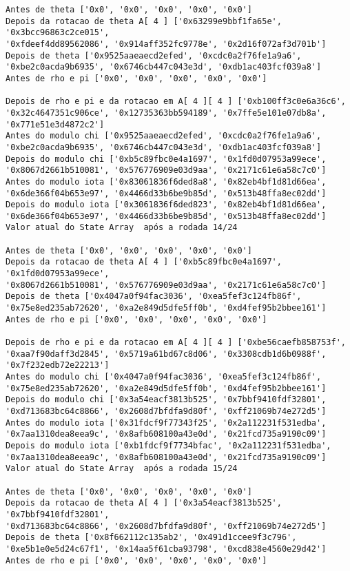 \documentclass[12pt, a4paper]{article}
\begin{document}
\begin{enumerate}
\begin{enumerate}
\begin{verbatim}
Antes de theta ['0x0', '0x0', '0x0', '0x0', '0x0']
Depois da rotacao de theta A[ 4 ] ['0x63299e9bbf1fa65e', '0x3bcc96863c2ce015',
'0xfdeef4dd89562086', '0x914aff352fc9778e', '0x2d16f072af3d701b']
Depois de theta ['0x9525aaeaecd2efed', '0xcdc0a2f76fe1a9a6',
'0xbe2c0acda9b6935', '0x6746cb447c043e3d', '0xdb1ac403fcf039a8']
Antes de rho e pi ['0x0', '0x0', '0x0', '0x0', '0x0']

Depois de rho e pi e da rotacao em A[ 4 ][ 4 ] ['0xb100ff3c0e6a36c6',
'0x32c4647351c906ce', '0x12735363bb594189', '0x7ffe5e101e07db8a',
'0x771e51e3d4872c2']
Antes do modulo chi ['0x9525aaeaecd2efed', '0xcdc0a2f76fe1a9a6',
'0xbe2c0acda9b6935', '0x6746cb447c043e3d', '0xdb1ac403fcf039a8']
Depois do modulo chi ['0xb5c89fbc0e4a1697', '0x1fd0d07953a99ece',
'0x8067d2661b510081', '0x576776909e03d9aa', '0x2171c61e6a58c7c0']
Antes do modulo iota ['0x83061836f6ded8a8', '0x82eb4bf1d81d66ea',
'0x6de366f04b653e97', '0x4466d33b6be9b85d', '0x513b48ffa8ec02dd']
Depois do modulo iota ['0x3061836f6ded823', '0x82eb4bf1d81d66ea',
'0x6de366f04b653e97', '0x4466d33b6be9b85d', '0x513b48ffa8ec02dd']
Valor atual do State Array  após a rodada 14/24

Antes de theta ['0x0', '0x0', '0x0', '0x0', '0x0']
Depois da rotacao de theta A[ 4 ] ['0xb5c89fbc0e4a1697', '0x1fd0d07953a99ece',
'0x8067d2661b510081', '0x576776909e03d9aa', '0x2171c61e6a58c7c0']
Depois de theta ['0x4047a0f94fac3036', '0xea5fef3c124fb86f',
'0x75e8ed235ab72620', '0xa2e849d5dfe5ff0b', '0xd4fef95b2bbee161']
Antes de rho e pi ['0x0', '0x0', '0x0', '0x0', '0x0']

Depois de rho e pi e da rotacao em A[ 4 ][ 4 ] ['0xbe56caefb858753f',
'0xaa7f90daff3d2845', '0x5719a61bd67c8d06', '0x3308cdb1d6b0988f',
'0x7f232edb72e22213']
Antes do modulo chi ['0x4047a0f94fac3036', '0xea5fef3c124fb86f',
'0x75e8ed235ab72620', '0xa2e849d5dfe5ff0b', '0xd4fef95b2bbee161']
Depois do modulo chi ['0x3a54eacf3813b525', '0x7bbf9410fdf32801',
'0xd713683bc64c8866', '0x2608d7bfdfa9d80f', '0xff21069b74e272d5']
Antes do modulo iota ['0x31fdcf9f77343f25', '0x2a112231f531edba',
'0x7aa1310dea8eea9c', '0x8afb608100a43e0d', '0x21fcd735a9190c09']
Depois do modulo iota ['0xb1fdcf9f7734bfac', '0x2a112231f531edba',
'0x7aa1310dea8eea9c', '0x8afb608100a43e0d', '0x21fcd735a9190c09']
Valor atual do State Array  após a rodada 15/24

Antes de theta ['0x0', '0x0', '0x0', '0x0', '0x0']
Depois da rotacao de theta A[ 4 ] ['0x3a54eacf3813b525', '0x7bbf9410fdf32801',
'0xd713683bc64c8866', '0x2608d7bfdfa9d80f', '0xff21069b74e272d5']
Depois de theta ['0x8f662112c135ab2', '0x491d1ccee9f3c796',
'0xe5b1e0e5d24c67f1', '0x14aa5f61cba93798', '0xcd838e4560e29d42']
Antes de rho e pi ['0x0', '0x0', '0x0', '0x0', '0x0']


\end{verbatim}
\end{enumerate}
\end{enumerate}
\end{document}

